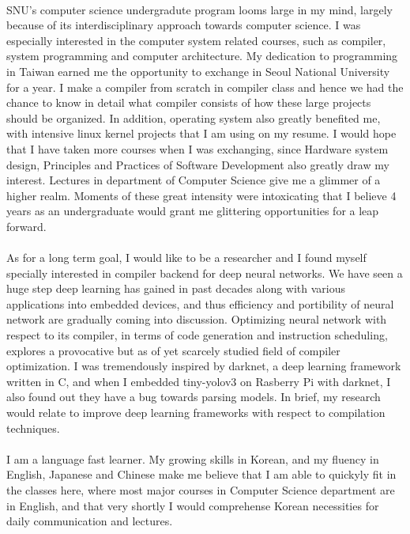 \documentclass{article}
\begin{document}
 \\
 SNU's computer science undergradute program looms large in my mind, largely because of its interdisciplinary approach towards computer science. I was especially interested in the computer system related courses, such as compiler, system programming and computer architecture. My dedication to programming in Taiwan earned me the opportunity to exchange in Seoul National University for a year. I make a compiler from scratch in compiler class and hence we had the chance to know in detail what compiler consists of how these large projects should be organized. In addition, operating system also greatly benefited me, with intensive linux kernel projects that I am using on my resume. I would hope that I have taken more courses when I was exchanging, since Hardware system design, Principles and Practices of Software Development also greatly draw my interest. Lectures in department of Computer Science give me a glimmer of a higher realm. Moments of these great intensity were intoxicating that I believe 4 years as an undergraduate would grant me glittering opportunities for a leap forward. \\
 \\
 As for a long term goal, I would like to be a researcher and I found myself specially interested in compiler backend for deep neural networks. We have seen a huge step deep learning has gained in past decades along with various applications into embedded devices, and thus efficiency and portibility of neural network are gradually coming into discussion. Optimizing neural network with respect to its compiler, in terms of code generation and instruction scheduling, explores a provocative but as of yet scarcely studied field of compiler optimization. I was tremendously inspired by darknet, a deep learning framework written in C, and when I embedded tiny-yolov3 on Rasberry Pi with darknet, I also found out they have a bug towards parsing models. In brief, my research would relate to improve deep learning frameworks with respect to compilation techniques.\\
 \\
 I am a language fast learner. My growing skills in Korean, and my fluency in English, Japanese and Chinese make me believe that I am able to quickyly fit in the classes here, where most major courses in Computer Science department are in English, and that very shortly I would comprehense Korean necessities for daily communication and lectures. \\
 \\
\end{document}
